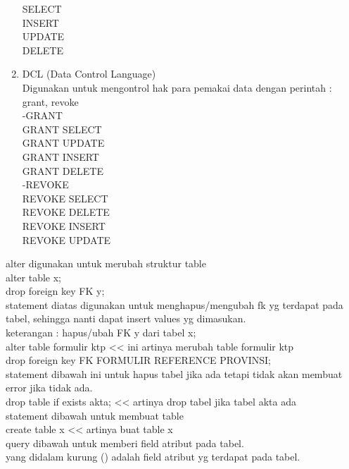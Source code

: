 \begin{enumerate}
      SELECT\\
      INSERT\\
      UPDATE\\
      DELETE\\

\item DCL (Data Control Language)\\
   Digunakan untuk mengontrol hak para pemakai data dengan perintah : grant, revoke\\

   -GRANT\\
      GRANT SELECT\\
      GRANT UPDATE\\
      GRANT INSERT\\
      GRANT DELETE\\
   -REVOKE\\
      REVOKE SELECT\\
      REVOKE DELETE\\
      REVOKE INSERT\\
      REVOKE UPDATE\\
\end{enumerate}
alter digunakan untuk merubah struktur table\\
alter table x;\\ 
drop foreign key FK y;\\
statement diatas digunakan untuk menghapus/mengubah fk yg terdapat pada tabel, sehingga nanti dapat insert values yg dimasukan.\\
keterangan : hapus/ubah FK y dari tabel x;\\

   alter table formulir ktp << ini artinya merubah table formulir ktp\\
      drop foreign key FK FORMULIR REFERENCE PROVINSI;\\

statement dibawah ini untuk hapus tabel jika ada tetapi tidak akan membuat error jika tidak ada.\\
   drop table if exists akta;  << artinya drop tabel jika tabel akta ada\\

statement dibawah untuk membuat table\\
create table x    << artinya buat table x\\

query dibawah untuk memberi field atribut pada tabel.\\
yang didalam kurung () adalah field atribut yg terdapat pada tabel.\\

